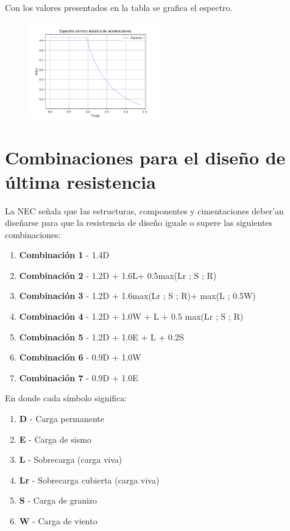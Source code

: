 \documentclass{report}
\begin{document}
    Con los valores presentados en la tabla se grafica el espectro.
    
    \begin{figure}[h]
        \centering
        \includegraphics[width=0.5\textwidth]{imagenes/espectro.png}
    \end{figure}

\section{Combinaciones para el dise\~no de \'ultima resistencia}
La NEC se\~nala que las estructuras, componentes y cimentaciones deber'an dise\~narse
para que la resistencia de dise\~no iguale o supere las siguientes combinaciones:

\begin{enumerate}
    \item \textbf{Combinaci\'on 1} - 1.4D
    \item \textbf{Combinaci\'on 2} - 1.2D + 1.6L+ 0.5max(Lr ; S ; R)
    \item \textbf{Combinaci\'on 3} - 1.2D + 1.6max(Lr ; S ; R)+ max(L ; 0.5W)
    \item \textbf{Combinaci\'on 4} - 1.2D + 1.0W + L + 0.5 max(Lr ; S ; R)
    \item \textbf{Combinaci\'on 5} - 1.2D + 1.0E + L + 0.2S
    \item \textbf{Combinaci\'on 6} - 0.9D + 1.0W
    \item \textbf{Combinaci\'on 7} - 0.9D + 1.0E
\end{enumerate}

En donde cada s\'imbolo significa:

\begin{enumerate}
    \item[\textbullet] \textbf{D} - Carga permanente
    \item[\textbullet] \textbf{E} - Carga de sismo
    \item[\textbullet] \textbf{L} - Sobrecarga (carga viva)
    \item[\textbullet] \textbf{Lr} - Sobrecarga cubierta (carga viva)
    \item[\textbullet] \textbf{S} - Carga de granizo
    \item[\textbullet] \textbf{W} - Carga de viento
\end{enumerate}
\end{document}
